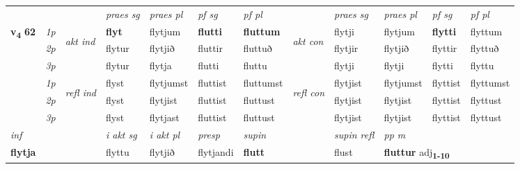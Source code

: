 \begin{longtable}[l]{X>{\footnotesize\itshape}llXXXXlXXXX}
 & &   & \textit{praes sg}  & \textit{praes pl}    & \textit{ pf sg} & \textit{pf pl} & & \textit{praes sg}  & \textit{praes pl}    & \textit{pf sg} & \textit{pf pl }  \\ \cmidrule{4-7} \cmidrule{9-12}
 \multirow{2}{*}{{{\textbf{v{\textsubscript{4}}} \Large{\textbf{62}}}}}  & 1p & \multirow{3}{*}{\begin{turn}{90}\textit{akt ind}\end{turn}} & \textbf{flyt} & flytjum & \textbf{flutti} & \textbf{fluttum} & \multirow{3}{*}{\begin{turn}{90}\textit{akt con}\end{turn}} &flytji & flytjum & \textbf{flytti} & flyttum\\*
 & 2p &  &  flytur  & flytjið & fluttir & fluttuð & & flytjir & flytjið & flyttir & flyttuð \\*
 & 3p &  & flytur & flytja & flutti & fluttu & & flytji & flytji& flytti & flyttu \\*
\cmidrule{4-7} \cmidrule{9-12}
 & 1p & \multirow{3}{*}{\begin{turn}{90}\textit{refl ind}\end{turn}}  & flyst & flytjumst & fluttist & fluttumst & \multirow{3}{*}{\begin{turn}{90}\textit{refl con}\end{turn}}  &flytjist & flytjumst & flyttist & flyttumst \\*
 & 2p &  & flyst & flytjist & fluttist & fluttust & &flytjist & flytjist & flyttist & flyttust \\*
 & 3p  & & flyst & flytjast & fluttist & fluttust & & flytjist & flytjist& flyttist & flyttust \\*
\cmidrule{4-7} \cmidrule{9-12}

   {\textit{inf}} & &  & \textit{i akt sg} & \textit{i akt pl}   & \textit{presp} & \textit{supin} && \textit{supin refl} & \textit{pp m} \\*
  {\textbf{flytja}} & && flyttu  & flytjið   & flytjandi &  \textbf{flutt} && flust & \multicolumn{2}{l}{\textbf{fluttur} adj\textbf{\textsubscript{1-10}}} \\*

\midrule


\end{longtable}
